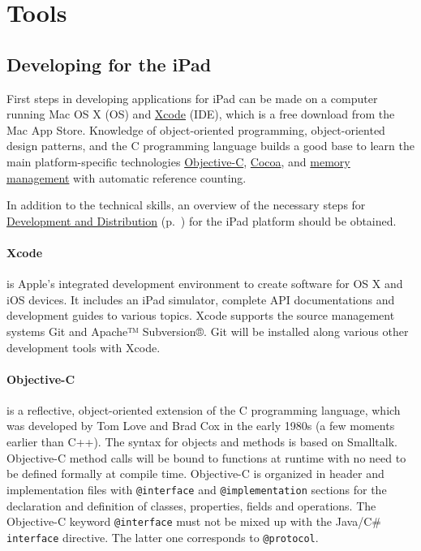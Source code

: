 
\section{Tools}

\subsection{Developing for the iPad}

First steps in developing applications for iPad can be made on a computer running Mac OS X (OS) and 
\href{sec:Xcode}{Xcode} (IDE), which is a free download from the Mac App Store.
Knowledge of object-oriented programming, object-oriented design patterns, 
and the C programming language 
builds a good base to learn the main platform-specific technologies 
\href{sec:ObjC}{Objective-C},
\href{sec:Cocoa}{Cocoa}, and
\href{sec:MemoryManagement}{memory management}
with automatic reference counting.

In addition to the technical skills, an overview of the necessary steps for 
\href{sec:DAD}{Development and Distribution} (p.~\pageref{sec:DAD}) for the iPad platform
should be obtained.

\paragraph{Xcode}
\label{sec:Xcode}
is Apple's integrated development environment to create software for OS X and iOS devices.
It includes an iPad simulator, complete API documentations and development guides to various topics. 
Xcode supports the source management systems Git and Apache™ Subversion®. 
Git will be installed along various other development tools with Xcode.

\paragraph{Objective-C}
\label{sec:ObjC}
is a reflective, object-oriented extension of the C programming language,
which was developed by Tom Love and Brad Cox in the early 1980s (a few moments earlier than C++). 
The syntax for objects and methods is based on Smalltalk. 
Objective-C method calls will be bound to functions at runtime with no need to be defined formally at compile time.
Objective-C is organized in header and implementation files 
with \verb+@interface+ and \verb+@implementation+ sections for
the declaration and definition of classes, properties, fields and operations.
The Objective-C keyword \verb+@interface+ must not be mixed up with the Java/C\# \verb+interface+ directive. 
The latter one corresponds to \verb+@protocol+.

